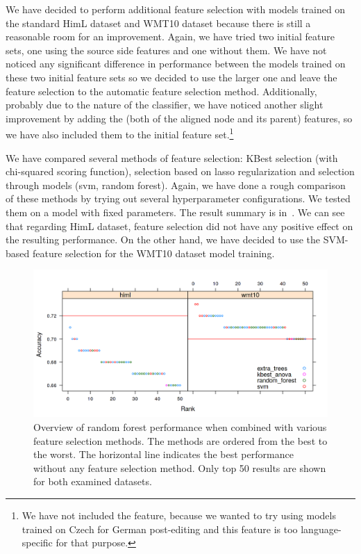 We have decided to perform additional feature selection with models trained on the standard HimL dataset
and WMT10 dataset because there is still a reasonable room for an improvement. Again, we have tried two initial feature
sets, one using the source side features and one without them. We have not noticed any significant difference in performance
between the models trained on these two initial feature sets so we decided to use the larger one and leave
the feature selection to the automatic feature selection method. Additionally, probably due to the nature of the classifier, we have noticed
another slight improvement by adding the  (both of the aligned node and its parent) features, so we have also
included them to the initial feature set.\footnote{We have not included the  feature, because we wanted to
try using models trained on Czech for German post-editing and this feature is too language-specific for that purpose.}

We have compared several methods of feature selection: KBest selection
(with chi-squared scoring function), selection based on lasso regularization and selection through
models (svm, random forest). Again, we have done a rough comparison of these methods by trying out
several hyperparameter configurations. We tested them on a model with fixed parameters. The result summary
is in~. We can see that regarding HimL dataset, feature selection did not have
any positive effect on the resulting performance. On the other hand, we have decided to use the SVM-based
feature selection for the WMT10 dataset model training.

\begin{figure}
\centering
  \includegraphics[scale=0.7]{cat-sel}
  \caption[Feature selection method comparison - Morphological prediction]{
    Overview of random forest performance when combined with various feature selection methods.
The methods are ordered from the best to the worst. The horizontal line indicates the best performance without
any feature selection method. Only top 50 results are shown for both examined datasets.
}
  \label{cats-sel}
\end{figure}

